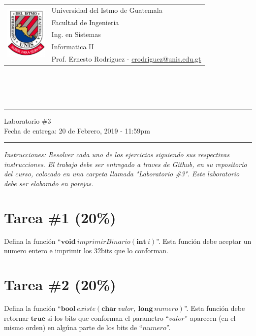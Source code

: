 \documentclass{article}
\newcommand{\horrule}[1]{\rule{\linewidth}{#1}}
\begin{document}
\begin{tabular}{l l}
\multirow{5}{*}{\includegraphics[width=2cm]{../../recursos/logo.png}} & Universidad del Istmo de Guatemala \\
 & Facultad de Ingenieria \\
 & Ing. en Sistemas \\
 & Informatica II \\
 & Prof. Ernesto Rodriguez - \href{mailto:erodriguez@unis.edu.gt}{erodriguez@unis.edu.gt} \\
\end{tabular}
\\\\\\

\begin{center}
        \horrule{0.5pt}
        \huge{Laboratorio \#3} \\
        \large{Fecha de entrega: 20 de Febrero, 2019 - 11:59pm} \\
        \horrule{1pt}
\end{center}

\emph{Instrucciones: Resolver cada uno de los ejercicios siguiendo sus respectivas
instrucciones. El trabajo debe ser entregado a traves de Github, en su repositorio del curso, colocado en una carpeta llamada "Laboratorio \#3".
Este laboratorio debe ser elaborado en parejas.}

\section*{Tarea \#1 (20\%)}

Defina la funci\'on ``$\mathbf{void}\ imprimirBinario(\mathbf{int}\ i)$''. Esta funci\'on debe aceptar
un numero entero e imprimir los 32bits que lo conforman.

\section*{Tarea \#2 (20\%)}

Defina la funci\'on ``$\mathbf{bool}\ existe(\mathbf{char}\ valor,\ \mathbf{long}\ numero)$''. Esta funci\'on
debe retornar $\mathbf{true}$ si los bits que conforman el parametro ``$valor$'' aparecen (en el mismo orden)
en alg\'una parte de los bits de ``$numero$''.
\end{document}
